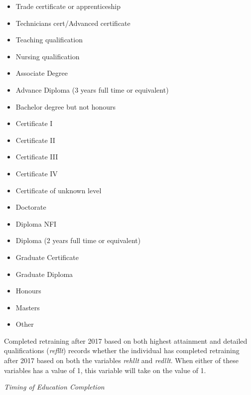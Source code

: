\documentclass[12pt, a4paper]{article}
\begin{document}
\begin{itemize}
  \item Trade certificate or apprenticeship
  \item Technicians cert/Advanced certificate
  \item Teaching qualification 
  \item Nursing qualification 
  \item Associate Degree
  \item Advance Diploma (3 years full time or equivalent)
  \item Bachelor degree but not honours
  \item Certificate I
  \item Certificate II
  \item Certificate III
  \item Certificate IV
  \item Certificate of unknown level
  \item Doctorate
  \item Diploma NFI
  \item Diploma (2 years full time or equivalent)
  \item Graduate Certificate
  \item Graduate Diploma 
  \item Honours 
  \item Masters 
  \item Other 
\end{itemize}  
  
Completed retraining after 2017 based on both highest attainment and detailed qualifications (\textit{refllt}) records whether the individual has completed retraining after 2017 based on both the variables \textit{rehllt} and \textit{redllt}. When either of these variables has a value of 1, this variable will take on the value of 1. 

\emph{Timing of Education Completion}
\end{document}
